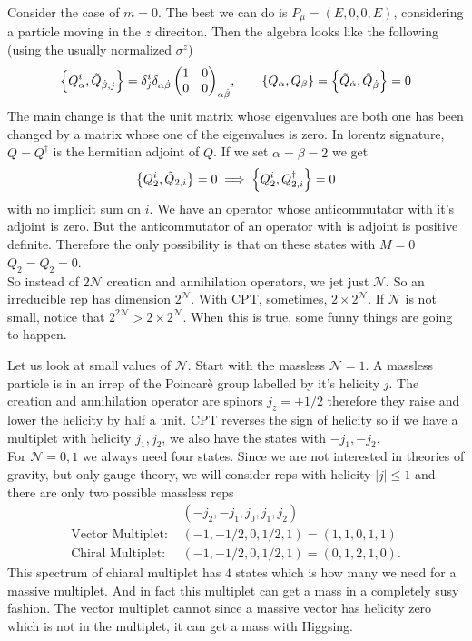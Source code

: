 \documentclass[11pt]{article}
\theoremstyle{definition}
\numberwithin{equation}{section}
\newcommand*\cN{\mathcal{N}}
\begin{document}
Consider the case of $m=0$. The best we can do is $P_{\mu}=(E,0,0,E)$, considering a particle moving in the $z$ direciton. Then the algebra looks like the following (using the usually normalized $\sigma^{z}$)
\begin{equation}
	\acomm{Q_{\alpha}^{i}}{\tilde{Q}_{\dot\beta,j}}=\delta^{i}_{j}\delta_{\alpha\dot\beta}\,\mqty(1&0\\0&0)_{\alpha\dot\beta},\qquad \acomm{Q_{\alpha}}{Q_{\beta}}=\acomm{\tilde{Q}_{\dot\alpha}}{\tilde{Q}_{\dot\beta}}=0
\end{equation}
The main change is that the unit matrix whose eigenvalues are both one has been changed by a matrix whose one of the eigenvalues is zero. In lorentz signature, $\tilde{Q}=Q^{\dagger}$ is the hermitian adjoint of $Q$. If we set $\alpha=\dot\beta=2$ we get
\begin{equation}
	\acomm{Q_{2}^{i}}{\tilde{Q}_{2,i}}=0\implies \acomm{Q_{2}^{i}}{Q^{\dagger}_{2,i}}=0
\end{equation}
with no implicit sum on $i$. We have an operator whose anticommutator with it's adjoint is zero. But the anticommutator of an operator with is adjoint is positive definite. Therefore the only possibility is that on these states with $M=0$ $Q_{2}=\tilde{Q}_{2}=0$.\\
So instead of $2\cN$ creation and annihilation operators, we jet just $\cN$. So an irreducible rep has dimension $2^{\cN}$. With CPT, sometimes, $2\times 2^{\cN}$. If $\cN$ is not small, notice that $2^{2\cN}>2\times 2^{\cN}$. When this is true, some funny things are going to happen.

Let us look at small values of $\cN$. Start with the massless $\cN=1$. A massless particle is in an irrep of the Poincarè group labelled by it's helicity $j$.
The creation and annihilation operator are spinors $j_{z}=\pm 1/2$ therefore they raise and lower the helicity by half a unit. CPT reverses the sign of helicity so if we have a multiplet with helicity $j_{1},j_{2}$, we also have the states with $-j_{1},-j_{2}$.\\
For $\cN=0,1$ we always need four states. Since we are not interested in theories of gravity, but only gauge theory, we will consider reps with helicity $|j|\le1$ and there are only two possible massless reps
\begin{equation}
\begin{split}
	&(-j_{2},-j_{1},j_{0},j_{1},j_{2})\\
	\text{Vector Multiplet: }&(-1,-1/2,0,1/2,1)=(1,1,0,1,1)\\
	\text{Chiral Multiplet: }&(-1,-1/2,0,1/2,1)=(0,1,2,1,0).
\end{split}
\end{equation}
This spectrum of chiaral multiplet has $4$ states which is how many we need for a massive multiplet. And in fact this multiplet can get a mass in a completely susy fashion. The vector multiplet cannot since a massive vector has helicity zero which is not in the multiplet, it can get a mass with Higgsing.
\end{document}
